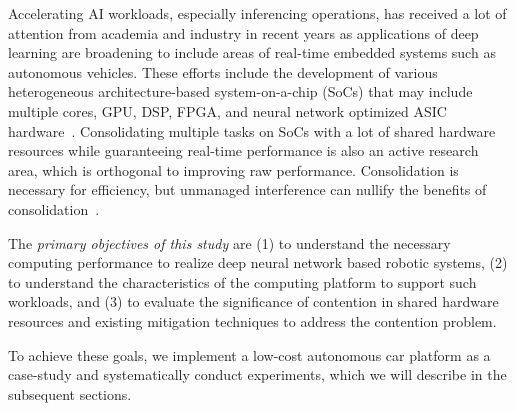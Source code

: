 Accelerating AI workloads, especially inferencing
operations, has received a lot of attention from academia and industry
in recent years as applications of deep learning are broadening to include
areas of real-time embedded systems such as autonomous vehicles. These
efforts include the development of various heterogeneous architecture-based 
system-on-a-chip (SoCs) that may include multiple cores, GPU,
DSP, FPGA, and neural network optimized ASIC hardware~\cite{Jouppi2017}.
Consolidating multiple tasks on SoCs with a lot of shared hardware
resources while guaranteeing real-time performance is also an active
research area, which is orthogonal to improving raw
performance. Consolidation is necessary for efficiency, but unmanaged 
interference can nullify the benefits of consolidation~\cite{Kim2016}.

The \emph{primary objectives of this study} are (1) to understand the
necessary computing performance to realize deep neural network based
robotic systems, (2) to understand the characteristics of the
computing platform to support such workloads, and (3) to evaluate the
significance of contention in shared hardware resources and existing
mitigation techniques to address the contention problem.

To achieve these goals, we implement a low-cost autonomous car platform
as a case-study and systematically conduct experiments, which we will 
describe in the subsequent sections.
